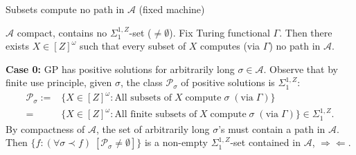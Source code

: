 \begin{frame}{Subsets compute no path in $\mathcal{A}$ (fixed machine)}
  \begin{lemma}
    \label{lemma:fixed-machine}
    $\mathcal{A}$ compact, contains no $\Sigma_1^{1,Z}$-set
    ($\neq\emptyset$). Fix Turing functional $\Gamma$. Then there exists
    $X\in[Z]^\omega$ such that every subset of $X$ computes (via $\Gamma$)
    no path in $\mathcal{A}$.


  \end{lemma}

  \vspace{0.5em}
  \textbf{Case 0:} GP has positive solutions for arbitrarily long
  $\sigma\in\mathcal{A}$. Observe that by finite use principle, given
  $\sigma$, the class $\mathcal{P}_{\sigma}$ of positive solutions is
  $\Sigma_1^{1,Z}$:
  \begin{align*}
    \mathcal{P}_{\sigma}:= &\{X\in[Z]^\omega: \text{All subsets of}\; X\;
      \text{compute}\; \sigma\; (\text{via}\; \Gamma)\}\\
    =&\{X\in[Z]^\omega: \text{All finite subsets of}\; X\;
      \text{compute}\; \sigma\; (\text{via}\; \Gamma)\}
      \in\Sigma_1^{1,Z}.
  \end{align*}
  By compactness of $\mathcal{A}$, the set of arbitrarily long $\sigma$'s
  must contain a path in $\mathcal{A}$. Then $\{f:(\forall \sigma\prec f)\;
  [\mathcal{P}_\sigma \neq \emptyset]\}$ is a non-empty
  $\Sigma_1^{1,Z}$-set contained in $\mathcal{A}$, $\Rightarrow\Leftarrow$.
\end{frame}

